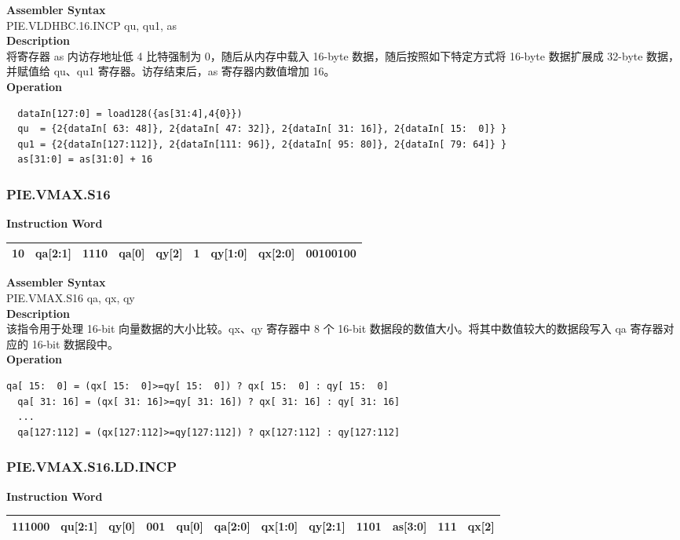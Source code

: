 \textbf{Assembler Syntax} \\
PIE.VLDHBC.16.INCP qu, qu1, as \\
\textbf{Description} \\
将寄存器 as 内访存地址低 4 比特强制为 0，随后从内存中载入 16-byte 数据，随后按照如下特定方式将 16-byte 数据扩展成 32-byte 数据，并赋值给 qu、qu1 寄存器。访存结束后，as 寄存器内数值增加 16。\\
\textbf{Operation}
\begin{lstlisting}
  dataIn[127:0] = load128({as[31:4],4{0}})
  qu  = {2{dataIn[ 63: 48]}, 2{dataIn[ 47: 32]}, 2{dataIn[ 31: 16]}, 2{dataIn[ 15:  0]} }
  qu1 = {2{dataIn[127:112]}, 2{dataIn[111: 96]}, 2{dataIn[ 95: 80]}, 2{dataIn[ 79: 64]} }
  as[31:0] = as[31:0] + 16
\end{lstlisting}

\newpage
\subsubsection{PIE.VMAX.S16}\label{instruction:PIEVMAXS16}
\setlength\tabcolsep{6pt}
\textbf{Instruction Word} \\
\begin{tabular}{|c|c|c|c|c|c|c|c|c|}
	\hline
	10 & qa[2:1] & 1110 & qa[0] & qy[2] & 1 & qy[1:0] & qx[2:0] & 00100100 \\
	\hline
\end{tabular}

\textbf{Assembler Syntax} \\
PIE.VMAX.S16 qa, qx, qy \\
\textbf{Description} \\
该指令用于处理 16-bit 向量数据的大小比较。qx、qy 寄存器中 8 个 16-bit 数据段的数值大小。将其中数值较大的数据段写入 qa 寄存器对应的 16-bit 数据段中。\\
\textbf{Operation}
\begin{lstlisting}[escapeinside=`?]
  qa[ 15:  0] = (qx[ 15:  0]>=qy[ 15:  0]) ? qx[ 15:  0] : qy[ 15:  0]
  qa[ 31: 16] = (qx[ 31: 16]>=qy[ 31: 16]) ? qx[ 31: 16] : qy[ 31: 16]
  ...
  qa[127:112] = (qx[127:112]>=qy[127:112]) ? qx[127:112] : qy[127:112]
\end{lstlisting}

\newpage
\subsubsection{PIE.VMAX.S16.LD.INCP}\label{instruction:PIEVMAXS16LDINCP}
\setlength\tabcolsep{6pt}
\textbf{Instruction Word} \\
\begin{tabular}{|c|c|c|c|c|c|c|c|c|c|c|c|}
	\hline
	111000 & qu[2:1] & qy[0] & 001 & qu[0] & qa[2:0] & qx[1:0] & qy[2:1] & 1101 & as[3:0] & 111 & qx[2] \\
	\hline
\end{tabular}

